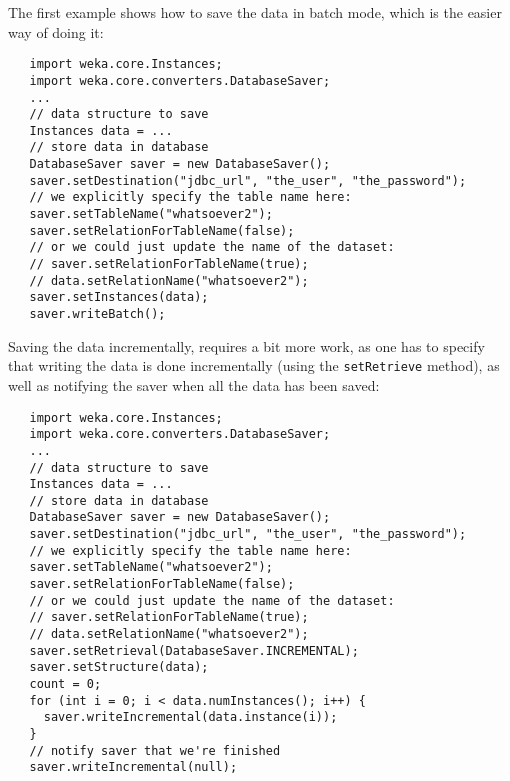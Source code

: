 The first example shows how to save the data in batch mode, which is the easier
way of doing it:
\begin{verbatim}
   import weka.core.Instances;
   import weka.core.converters.DatabaseSaver;
   ...
   // data structure to save
   Instances data = ...
   // store data in database
   DatabaseSaver saver = new DatabaseSaver();
   saver.setDestination("jdbc_url", "the_user", "the_password");
   // we explicitly specify the table name here:
   saver.setTableName("whatsoever2");
   saver.setRelationForTableName(false);
   // or we could just update the name of the dataset:
   // saver.setRelationForTableName(true);
   // data.setRelationName("whatsoever2");
   saver.setInstances(data);
   saver.writeBatch();
\end{verbatim}
Saving the data incrementally, requires a bit more work, as one has to specify
that writing the data is done incrementally (using the \texttt{setRetrieve}
method), as well as notifying the saver when all the data has been saved:
\begin{verbatim}
   import weka.core.Instances;
   import weka.core.converters.DatabaseSaver;
   ...
   // data structure to save
   Instances data = ...
   // store data in database
   DatabaseSaver saver = new DatabaseSaver();
   saver.setDestination("jdbc_url", "the_user", "the_password");
   // we explicitly specify the table name here:
   saver.setTableName("whatsoever2");
   saver.setRelationForTableName(false);
   // or we could just update the name of the dataset:
   // saver.setRelationForTableName(true);
   // data.setRelationName("whatsoever2");
   saver.setRetrieval(DatabaseSaver.INCREMENTAL);
   saver.setStructure(data);
   count = 0;
   for (int i = 0; i < data.numInstances(); i++) {
     saver.writeIncremental(data.instance(i));
   }
   // notify saver that we're finished
   saver.writeIncremental(null);
\end{verbatim}
